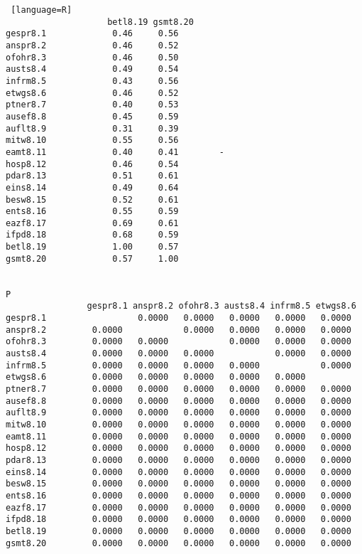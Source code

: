 \begin{lstlisting} [language=R]
                    betl8.19 gsmt8.20 
gespr8.1             0.46     0.56                    
anspr8.2             0.46     0.52                   
ofohr8.3             0.46     0.50                    
austs8.4             0.49     0.54                    
infrm8.5             0.43     0.56                    
etwgs8.6             0.46     0.52                      
ptner8.7             0.40     0.53                    
ausef8.8             0.45     0.59                    
auflt8.9             0.31     0.39                    
mitw8.10             0.55     0.56                    
eamt8.11             0.40     0.41        -            
hosp8.12             0.46     0.54                    
pdar8.13             0.51     0.61                   
eins8.14             0.49     0.64                     
besw8.15             0.52     0.61                    
ents8.16             0.55     0.59                    
eazf8.17             0.69     0.61                    
ifpd8.18             0.68     0.59                     
betl8.19             1.00     0.57                    
gsmt8.20             0.57     1.00                    


P
                gespr8.1 anspr8.2 ofohr8.3 austs8.4 infrm8.5 etwgs8.6
gespr8.1                  0.0000   0.0000   0.0000   0.0000   0.0000  
anspr8.2         0.0000            0.0000   0.0000   0.0000   0.0000  
ofohr8.3         0.0000   0.0000            0.0000   0.0000   0.0000  
austs8.4         0.0000   0.0000   0.0000            0.0000   0.0000  
infrm8.5         0.0000   0.0000   0.0000   0.0000            0.0000  
etwgs8.6         0.0000   0.0000   0.0000   0.0000   0.0000           
ptner8.7         0.0000   0.0000   0.0000   0.0000   0.0000   0.0000  
ausef8.8         0.0000   0.0000   0.0000   0.0000   0.0000   0.0000  
auflt8.9         0.0000   0.0000   0.0000   0.0000   0.0000   0.0000  
mitw8.10         0.0000   0.0000   0.0000   0.0000   0.0000   0.0000  
eamt8.11         0.0000   0.0000   0.0000   0.0000   0.0000   0.0000  
hosp8.12         0.0000   0.0000   0.0000   0.0000   0.0000   0.0000  
pdar8.13         0.0000   0.0000   0.0000   0.0000   0.0000   0.0000  
eins8.14         0.0000   0.0000   0.0000   0.0000   0.0000   0.0000  
besw8.15         0.0000   0.0000   0.0000   0.0000   0.0000   0.0000  
ents8.16         0.0000   0.0000   0.0000   0.0000   0.0000   0.0000  
eazf8.17         0.0000   0.0000   0.0000   0.0000   0.0000   0.0000  
ifpd8.18         0.0000   0.0000   0.0000   0.0000   0.0000   0.0000  
betl8.19         0.0000   0.0000   0.0000   0.0000   0.0000   0.0000  
gsmt8.20         0.0000   0.0000   0.0000   0.0000   0.0000   0.0000  
  

\end{lstlisting}
